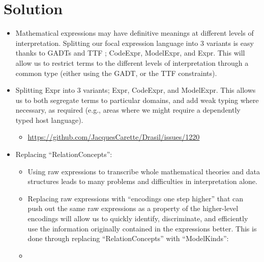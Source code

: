 \section{Solution}

\begin{itemize}

	\item Mathematical expressions may have definitive meanings at different
	      levels of interpretation. Splitting our focal expression language into
	      3 variants is easy thanks to GADTs and TTF \cite{Carette2009};
	      CodeExpr, ModelExpr, and Expr. This will allow us to restrict terms to
	      the different levels of interpretation through a common type (either
	      using the GADT, or the TTF constraints).

	\item Splitting Expr into 3 variants; Expr, CodeExpr, and ModelExpr. This
	      allows us to both segregate terms to particular domains, and add weak
	      typing where necessary, as required (e.g., areas where we might
	      require a dependently typed host language).

	      \begin{itemize}

		      \item
		            \url{https://github.com/JacquesCarette/Drasil/issues/1220}

	      \end{itemize}


	\item Replacing ``RelationConcepts'':

	      \begin{itemize}

		      \item Using raw expressions to transcribe whole mathematical
		            theories and data structures leads to many problems and
		            difficulties in interpretation alone.

		      \item Replacing raw expressions with ``encodings one step higher''
		            that can push out the same raw expressions as a property of
		            the higher-level encodings will allow us to quickly
		            identify, discriminate, and efficiently use the information
		            originally contained in the expressions better. This is done
		            through replacing ``RelationConcepts'' with ``ModelKinds'':

		      \item \currentModelKindsHaskell


\end{itemize}
\end{itemize}

